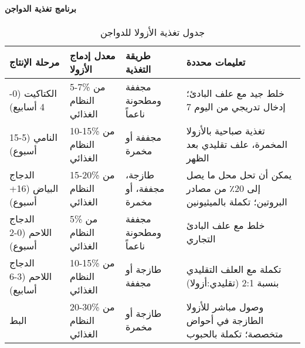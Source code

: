 \paragraph{برنامج تغذية الدواجن}
\begin{table}[h]
\centering
\caption{جدول تغذية الأزولا للدواجن}
\label{tab:poultry_feeding}
\begin{tabular}{|p{4cm}|p{2.5cm}|p{2.5cm}|p{4.5cm}|}
\hline
\textbf{مرحلة الإنتاج} & \textbf{معدل إدماج الأزولا} & \textbf{طريقة التغذية} & \textbf{تعليمات محددة} \\
\hline
الكتاكيت (0-4 أسابيع) & 5-7\% من النظام الغذائي & مجففة ومطحونة ناعماً & خلط جيد مع علف البادئ؛ إدخال تدريجي من اليوم 7 \\
\hline
النامي (5-15 أسبوع) & 10-15\% من النظام الغذائي & مجففة أو مخمرة & تغذية صباحية بالأزولا المخمرة، علف تقليدي بعد الظهر \\
\hline
الدجاج البياض (16+ أسبوع) & 15-20\% من النظام الغذائي & طازجة، مجففة، أو مخمرة & يمكن أن تحل محل ما يصل إلى 20٪ من مصادر البروتين؛ تكملة بالميثيونين \\
\hline
الدجاج اللاحم (0-2 أسبوع) & 5\% من النظام الغذائي & مجففة ومطحونة ناعماً & خلط مع علف البادئ التجاري \\
\hline
الدجاج اللاحم (3-6 أسابيع) & 10-15\% من النظام الغذائي & طازجة أو مجففة & تكملة مع العلف التقليدي بنسبة 2:1 (تقليدي:أزولا) \\
\hline
البط & 20-30\% من النظام الغذائي & طازجة أو مخمرة & وصول مباشر للأزولا الطازجة في أحواض متخصصة؛ تكملة بالحبوب \\
\hline
\end{tabular}
\end{table}

